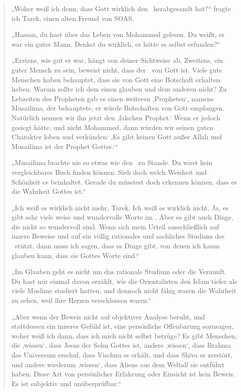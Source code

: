 \documentclass[12pt]{memoir}
\begin{document}
\begin{quote}
„Woher weiß ich denn, dass Gott wirklich den \Quran\ herabgesandt hat?“
fragte ich Tarek, einen alten Freund von SOAS.

„Hassan, du hast über das Leben von Mohammed gelesen.
Du weißt, er war ein guter Mann.
Denkst du wirklich, er hätte es selbst erfunden?“

„Erstens, wie gut er war, hängt von deiner Sichtweise ab.
Zweitens, ein guter Mensch zu sein, beweist nicht,
dass der \Quran\ von Gott ist.
Viele gute Menschen haben behauptet,
dass sie von Gott eine Botschaft erhalten haben.
Warum sollte ich dem einen glauben und dem anderen nicht?
Zu Lebzeiten des Propheten gab es einen weiteren ‚Propheten‘,
namens Musailima, der behauptete, er würde Botschaften von Gott empfangen.
Natürlich nennen wir ihn jetzt den ‚falschen Prophet.‘
Wenn er jedoch gesiegt hätte, und nicht Mohammed,
dann würden wir seinen guten Charakter loben und verkünden:
‚Es gibt keinen Gott außer Allah und Musailima ist der Prophet Gottes.‘“

„Musailima brachte nie so etwas wie den \Quran\ zu Stande.
Du wirst kein vergleichbares Buch finden können.
Sieh doch welch Weisheit und Schönheit es beinhaltet.
Gerade du müsstest doch erkennen können, dass es die Wahrheit Gottes ist.“

„Ich weiß es wirklich nicht mehr, Tarek.
Ich weiß es wirklich nicht.
Ja, es gibt sehr viele weise und wundervolle Worte im \Quran.
Aber es gibt auch Dinge, die nicht so wundervoll sind.
Wenn sich mein Urteil ausschließlich auf innere Beweise und
auf ein völlig rationales und sachliches Studium des \Quran\ stützt,
dann muss ich sagen, dass es Dinge gibt,
von denen ich kaum glauben kann, dass sie Gottes Worte sind.“

„Im Glauben geht es nicht um das rationale Studium oder die Vernunft.
Du hast mir einmal davon erzählt, wie die Orientalisten
den Islam tiefer als viele Muslime studiert hatten,
und dennoch nicht fähig waren die Wahrheit zu sehen,
weil ihre Herzen verschlossen waren.“

„Aber wenn der Beweis nicht auf objektiver Analyse beruht,
und stattdessen ein inneres Gefühl ist, eine persönliche Offenbarung sozusagen,
woher weiß ich dann, dass ich mich nicht selbst betrüge?
Es gibt Menschen, die ‚wissen‘, dass Jesus der Sohn Gottes ist,
andere ‚wissen‘, dass Brahma das Universum erschuf,
dass Vischnu es erhält, und dass Shiva es zerstört,
und andere wiederum ‚wissen‘,
dass Aliens aus dem Weltall sie entführt haben.
Diese Art von persönlicher Erfahrung oder Einsicht ist kein Beweis.
Es ist subjektiv und unüberprüfbar.“


\end{quote}
\end{document}
